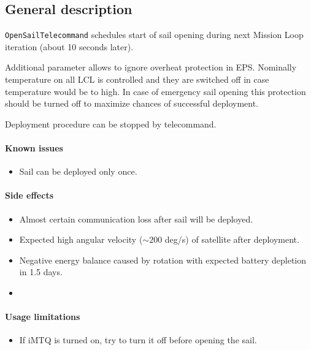 

\subsection{General description}


\texttt{OpenSailTelecommand} schedules start of sail opening during next Mission Loop iteration (about 10 seconds later). 

Additional parameter allows to ignore overheat protection in EPS.
Nominally temperature on all LCL is controlled and they are switched off in case temperature would be to high. In case of emergency sail opening this protection should be turned off to maximize chances of successful deployment.

Deployment procedure can be stopped by  telecommand.

\paragraph{Known issues}
\begin{itemize}
	\item Sail can be deployed only once. 
\end{itemize}

\paragraph{Side effects}
\begin{itemize}
	\item Almost certain communication loss after sail will be deployed.
    \item Expected high angular velocity (${\sim}200$ deg/s) of satellite after deployment.
    \item Negative energy balance caused by rotation with expected battery depletion in 1.5 days. 
    \item {}
\end{itemize}

\paragraph{Usage limitations}
\begin{itemize}
	\item If iMTQ is turned on, try to turn it off before opening the sail.
\end{itemize}

